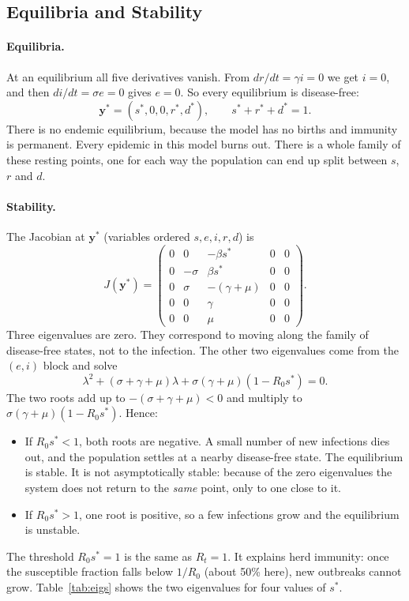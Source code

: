 \documentclass[11pt,a4paper]{article}
\begin{document}
\subsection{Equilibria and Stability}
\paragraph{Equilibria.} At an equilibrium all five derivatives vanish. From $dr/dt = \gamma i = 0$ we get $i = 0$, and then $di/dt = \sigma e = 0$ gives $e = 0$. So every equilibrium is disease-free:
\begin{equation}
    \mathbf{y}^* = (s^*, 0, 0, r^*, d^*), \qquad s^* + r^* + d^* = 1.
\end{equation}
There is no endemic equilibrium, because the model has no births and immunity is permanent. Every epidemic in this model burns out. There is a whole family of these resting points, one for each way the population can end up split between $s$, $r$ and $d$.

\paragraph{Stability.} The Jacobian at $\mathbf{y}^*$ (variables ordered $s, e, i, r, d$) is
\begin{equation}
    J(\mathbf{y}^*) = \begin{pmatrix}
    0 & 0 & -\beta s^* & 0 & 0 \\
    0 & -\sigma & \beta s^* & 0 & 0 \\
    0 & \sigma & -(\gamma + \mu) & 0 & 0 \\
    0 & 0 & \gamma & 0 & 0 \\
    0 & 0 & \mu & 0 & 0
    \end{pmatrix}.
\end{equation}
Three eigenvalues are zero. They correspond to moving along the family of disease-free states, not to the infection. The other two eigenvalues come from the $(e,i)$ block and solve
\begin{equation}
    \lambda^2 + (\sigma + \gamma + \mu)\lambda + \sigma(\gamma + \mu)(1 - R_0 s^*) = 0.
    \label{eq:charpoly}
\end{equation}
The two roots add up to $-(\sigma+\gamma+\mu) < 0$ and multiply to $\sigma(\gamma+\mu)(1 - R_0 s^*)$. Hence:
\begin{itemize}
    \item If $R_0 s^* < 1$, both roots are negative. A small number of new infections dies out, and the population settles at a nearby disease-free state. The equilibrium is stable. It is not asymptotically stable: because of the zero eigenvalues the system does not return to the \emph{same} point, only to one close to it.
    \item If $R_0 s^* > 1$, one root is positive, so a few infections grow and the equilibrium is unstable.
\end{itemize}
The threshold $R_0 s^* = 1$ is the same as $R_t = 1$. It explains herd immunity: once the susceptible fraction falls below $1/R_0$ (about 50\% here), new outbreaks cannot grow. Table~\ref{tab:eigs} shows the two eigenvalues for four values of $s^*$.
\end{document}
